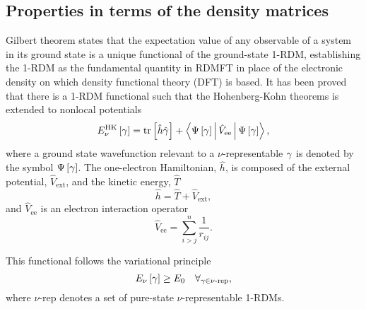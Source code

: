\subsection{Properties in terms of the density matrices} %
\label{sub:Properties in terms of the density matrices}

Gilbert theorem states that the expectation
value of any observable of a system in its ground state is a unique functional
of the ground-state 1-RDM, establishing the 1-RDM as the fundamental quantity
in RDMFT in place of the electronic density on which density functional theory
(DFT) is based.
It has been proved that there is a 1-RDM functional
such that the Hohenberg-Kohn theorems is extended to 
nonlocal potentials
\begin{equation} \label{ec:HK-functional}
    \func{E_{\nu}^{\text{HK}}}{\fordm} = 
    \mytrace{\hat{h} \hat{\fordm}} + 
    \Braket{\func{\Psi}{\fordm} | \hat{V}_{\text{ee}} | \func{\Psi}{\fordm}}
    ,
\end{equation}
where a ground state wavefunction relevant to a $\nu$-representable $\gamma$ 
is denoted by the symbol $\Psi \left[ \gamma \right]$.
The one-electron Hamiltonian, $\hat{h}$, is composed of the external
potential, $\hat{V}_{\text{ext}}$, and the kinetic energy, $\hat{T}$
\begin{equation}
    \hat{h} = \hat{T} + \hat{V}_{\text{ext}}
    ,
\end{equation}
and $\hat{V}_{\text{ee}}$ is an electron interaction operator 
\begin{equation}
    \hat{V}_{\text{ee}} = 
    \sum_{i>j}^{n} \frac{1}{r_{ij}}
    .
\end{equation}

This functional follows the variational principle 
\begin{equation} \label{ec:var-princ-nu-rep}
    E_{\nu} \left[ \gamma \right] \ge E_0 \quad \forall_{\gamma \in \text{$\nu$-rep}}
    ,
\end{equation}
where $\nu$-rep denotes a set of pure-state $\nu$-representable 1-RDMs.

